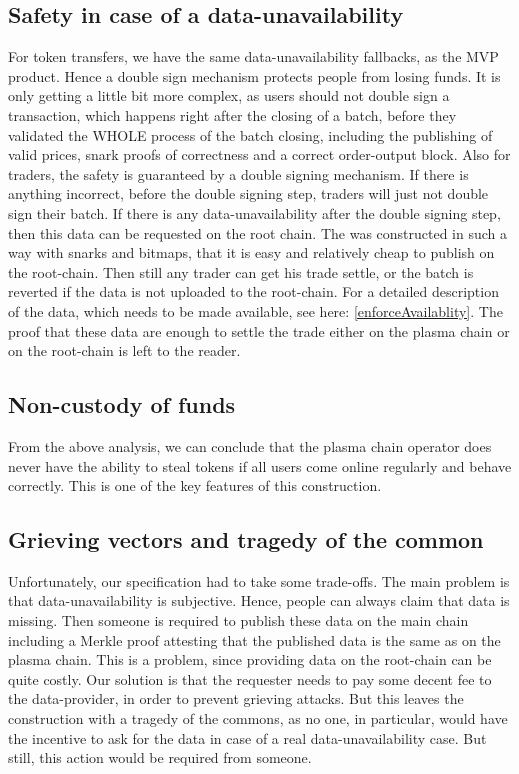 \documentclass[11pt,parskip=full]{scrartcl}%
\begin{document}
\subsection{Safety in case of a data-unavailability}
For token transfers, we have the same data-unavailability fallbacks, as the MVP product.
Hence a double sign mechanism protects people from losing funds.
It is only getting a little bit more complex, as users should not double sign a transaction, which happens right after the closing of a batch, before they validated the WHOLE process of the batch closing, including the publishing of valid prices, snark proofs of correctness and a correct order-output block.
Also for traders, the safety is guaranteed by a  double signing mechanism.
If there is anything incorrect, before the double signing step, traders will just not double sign their batch.
If there is any data-unavailability after the double signing step, then this data can be requested on the root chain.
The was constructed in such a way with snarks and bitmaps, that it is easy and relatively cheap to publish on the root-chain.
Then still any trader can get his trade settle, or the batch is reverted if the data is not uploaded to the root-chain.
For a detailed description of the data, which needs to be made available, see here: \ref{enforceAvailablity}.
The proof that these data are enough to settle the trade either on the plasma chain or on the root-chain is left to the reader.

\subsection{Non-custody of funds}
From the above analysis, we can conclude that the plasma chain operator does never have the ability to steal tokens if all users come online regularly and behave correctly.
This is one of the key features of this construction.

\subsection{Grieving vectors and tragedy of the common}
Unfortunately, our specification had to take some trade-offs.
The main problem is that data-unavailability is subjective.
Hence, people can always claim that data is missing.
Then someone is required to publish these data on the main chain including a Merkle proof attesting that the published data is the same as on the plasma chain.
This is a problem, since providing data on the root-chain can be quite costly.
Our solution is that the requester needs to pay some decent fee to the data-provider, in order to prevent grieving attacks.
But this leaves the construction with a tragedy of the commons, as no one, in particular, would have the incentive to ask for the data in case of a real data-unavailability case.
But still, this action would be required from someone.
\end{document}
